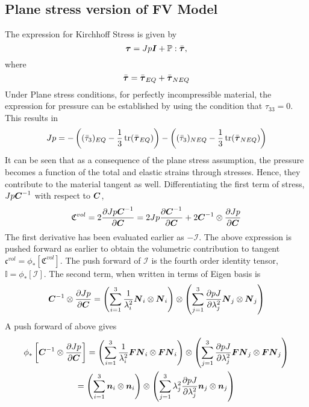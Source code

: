 \documentclass[11pt,twoside,TimesRoman]{article}
\newcommand{\parder}[2]{{\dfrac{\partial #1}{\partial #2}}}
\begin{document}
\subsection{Plane stress version of FV Model}
The expression for Kirchhoff Stress is given by
\begin{equation}
\mbox{\boldmath $\tau$} = Jp\mbox{\boldmath $I$} + \mathbb{P}:\bar{\mbox{\boldmath $\tau$}},
\end{equation}
where
\begin{equation}
\bar{\mbox{\boldmath $\tau$}} = \bar{\mbox{\boldmath $\tau$}}_{EQ} + \bar{\mbox{\boldmath $\tau$}}_{NEQ}
\end{equation}
Under Plane stress conditions, for perfectly incompressible material, the expression for pressure can be established by using the condition that $\tau_{33}=0$. This results in
\begin{equation}
Jp = -\left((\bar{\tau}_{3})_{EQ}-\frac{1}{3}\operatorname{tr}(\bar{\mbox{\boldmath $\tau$}}_{EQ}) \right)-\left((\bar{\tau}_{3})_{NEQ}-\frac{1}{3}\operatorname{tr}(\bar{\mbox{\boldmath $\tau$}}_{NEQ}) \right)
\label{FV:pressureevaluation}
\end{equation}
It can be seen that as a consequence of the plane stress assumption, the pressure becomes a function of the total and elastic strains through stresses. Hence, they contribute to the material tangent as well. Differentiating the first term of stress, $Jp{\mbox{\boldmath $C$}}^{-1}$ with respect to $\mbox{\boldmath $C$}$,
\begin{equation}
	\mathfrak{C}^{vol} =2\parder{Jp\bfCinv}{\bfC} = 2Jp \parder{\bfCinv}{\bfC} + 2 \bfCinv \otimes \parder{Jp}{\bfC}
\end{equation}
The first derivative has been evaluated earlier as $ -\mathcal{I}$. The above expression is pushed forward as earlier to obtain the volumetric contribution to tangent $\mathfrak{c}^{vol} = \phi_* \left[\mathfrak{C}^{vol} \right]$. The push forward of $\mathcal{I}$ is the fourth order identity tensor, $\mathbb{I} = \phi_* \left[\mathcal{I} \right]$. The second term, when written in terms of Eigen basis is
\begin{equation}
\bfCinv \otimes \parder{Jp}{\bfC} = \left( \sum_{i=1}^{3} \frac{1}{\lambda_i^2} \bfN_i \otimes \bfN_i \right) \otimes \left( \sum_{j=1}^{3} \parder{pJ}{\lambda_j^2} \bfN_j \otimes \bfN_j \right)
\end{equation}
A push forward of above gives
\begin{multline}
\phi_* \left[\bfCinv \otimes \parder{Jp}{\bfC} \right] = \left( \sum_{i=1}^{3} \frac{1}{\lambda_i^2} \bfF\bfN_i \otimes \bfF\bfN_i \right) \otimes \left( \sum_{j=1}^{3} \parder{pJ}{\lambda_j^2} \bfF\bfN_j \otimes \bfF\bfN_j \right) \\
= \left( \sum_{i=1}^{3} \bfn_i \otimes \bfn_i \right) \otimes \left( \sum_{j=1}^{3} \lambda_j^2\parder{pJ}{\lambda_j^2} \bfn_j \otimes \bfn_j \right)
\end{multline}
\end{document}
